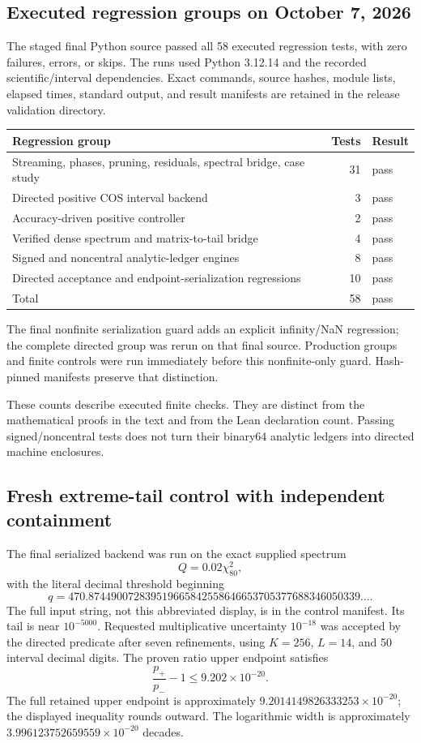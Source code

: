 \subsection{Executed regression groups on October 7, 2026}
The staged final Python source passed all 58 executed regression tests, with
zero failures, errors, or skips.  The runs used Python 3.12.14 and the recorded
scientific/interval dependencies.  Exact commands, source hashes, module
lists, elapsed times, standard output, and result manifests are retained in
the release validation directory.

\begin{center}
\begin{tabular}{@{}lrl@{}}
\toprule
Regression group & Tests & Result\\
\midrule
Streaming, phases, pruning, residuals, spectral bridge, case study & 31 & pass\\
Directed positive COS interval backend & 3 & pass\\
Accuracy-driven positive controller & 2 & pass\\
Verified dense spectrum and matrix-to-tail bridge & 4 & pass\\
Signed and noncentral analytic-ledger engines & 8 & pass\\
Directed acceptance and endpoint-serialization regressions & 10 & pass\\
\midrule
Total & 58 & pass\\
\bottomrule
\end{tabular}
\end{center}

The final nonfinite serialization guard adds an explicit infinity/NaN
regression; the complete directed group was rerun on that final source.
Production groups and finite controls were run immediately before this
nonfinite-only guard.  Hash-pinned manifests preserve that distinction.

These counts describe executed finite checks.  They are distinct from the
mathematical proofs in the text and from the Lean declaration count.  Passing
signed/noncentral tests does not turn their binary64 analytic ledgers into
directed machine enclosures.

\subsection{Fresh extreme-tail control with independent containment}
The final serialized backend was run on the exact supplied spectrum
\[
Q=0.02\chi^2_{80},
\]
with the literal decimal threshold beginning
\[
q=470.874490072839519665842558646653705377688346050339\ldots.
\]
The full input string, not this abbreviated display, is in the control
manifest.  Its tail is near \(10^{-5000}\).  Requested multiplicative
uncertainty \(10^{-18}\) was accepted by the directed predicate after seven
refinements, using \(K=256\), \(L=14\), and 50 interval decimal digits.
The proven ratio upper endpoint satisfies
\[
\boxed{\frac{p_+}{p_-}-1\le9.202\times10^{-20}.}
\]
The full retained upper endpoint is approximately
\(9.2014149826333253\times10^{-20}\); the displayed inequality rounds outward.
The logarithmic width is approximately
\(3.996123752659559\times10^{-20}\) decades.

